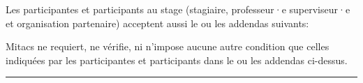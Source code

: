 {Les participantes et participants au stage (stagiaire, professeur·e superviseur·e et organisation partenaire) acceptent aussi le ou les addendas suivants:

Mitacs ne requiert, ne vérifie, ni n'impose aucune autre condition que celles indiquées par les participantes et participants dans le ou les addendas ci-dessus.
}

\rule{\linewidth}{2pt}

